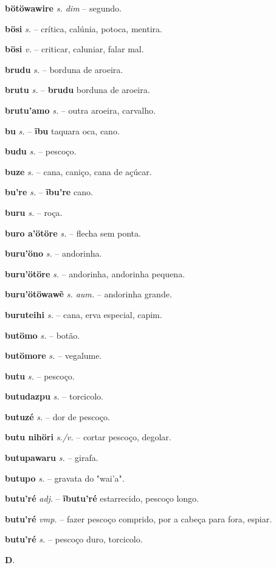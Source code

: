 \textbf{bötöwawire} \textit{s. dim} -- segundo.

\textbf{bösi} \textit{s.} -- crítica, calúnia, potoca, mentira.

\textbf{bösi} \textit{v.} -- criticar, caluniar, falar mal.

\textbf{brudu} \textit{s.} -- borduna de aroeira.

\textbf{brutu} \textit{s.} -- \textbf{brudu} borduna de aroeira.

\textbf{brutu'amo} \textit{s.} -- outra aroeira, carvalho.

\textbf{bu} \textit{s.} -- \textbf{ĩbu} taquara oca, cano.

\textbf{budu} \textit{s.} -- pescoço.

\textbf{buze} \textit{s.} -- cana, caniço, cana de açúcar.

\textbf{bu're} \textit{s.} -- \textbf{ĩbu're} cano.

\textbf{buru} \textit{s.} -- roça.

\textbf{buro a'ötöre} \textit{s.} -- flecha sem ponta.

\textbf{buru'öno} \textit{s.} -- andorinha.

\textbf{buru'ötöre} \textit{s.} -- andorinha, andorinha pequena.

\textbf{buru'ötöwawẽ} \textit{s. aum.} -- andorinha grande.

\textbf{buruteihi} \textit{s.} -- cana, erva especial, capim.

\textbf{butömo} \textit{s.} -- botão.

\textbf{butömore} \textit{s.} -- vegalume.

\textbf{butu} \textit{s.} -- pescoço.

\textbf{butudazpu} \textit{s.} -- torcicolo.

\textbf{butuzé} \textit{s.} -- dor de pescoço.

\textbf{butu nihöri} \textit{s./v.} -- cortar pescoço, degolar.

\textbf{butupawaru} \textit{s.} -- girafa.

\textbf{butupo} \textit{s.} -- gravata do "wai'a".

\textbf{butu'ré} \textit{adj.} -- \textbf{ĩbutu'ré} estarrecido, pescoço longo.

\textbf{butu'ré} \textit{vmp.} -- fazer pescoço comprido, por a cabeça para fora, espiar.

\textbf{butu'ré} \textit{s.} -- pescoço duro, torcicolo.


\textbf{D}.



